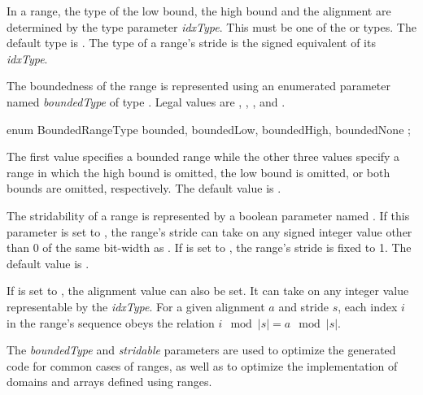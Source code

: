 In a range, the type of the low bound, the high bound and the alignment are
determined by the type parameter \emph{idxType}.
This must be one of the  or
 types.  The default type is .
The type of a range's stride is the signed equivalent of its \emph{idxType}.


The boundedness of the range is represented using an enumerated
parameter named \emph{boundedType} of type .
Legal values are , ,
, and .  
\begin{chapel}
enum BoundedRangeType { bounded, boundedLow, boundedHigh, boundedNone };
\end{chapel}
\noindent
The first value specifies
a bounded range while the other three values specify a range in which
the high bound is omitted, the low bound is omitted, or both bounds
are omitted, respectively.  The default value is .

The stridability of a range is represented by a boolean parameter
named .  If this parameter is set to , the range's
stride can take on any signed integer value other than 0 of the same
bit-width as .  If  is set to , the range's stride is
fixed to 1.  The default value is .

If  is set to , the alignment value can also be set.
It can take on any integer value representable by
the \emph{idxType}.  For a given alignment $a$ and stride $s$, each index $i$
in the range's sequence obeys the relation $i \!\mod |s| = a \!\mod |s|$.  

\begin{rationale}
The \emph{boundedType} and \emph{stridable} parameters are used
to optimize the generated code for common cases of ranges, as well as
to optimize the implementation of domains and arrays defined using ranges.
\end{rationale}

